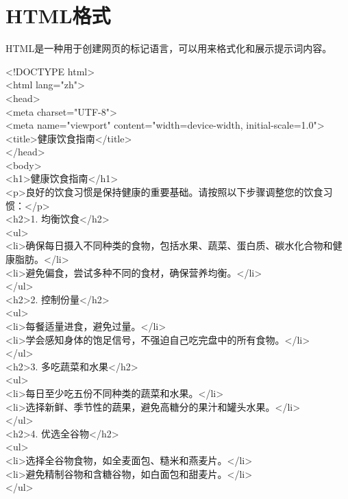 \documentclass[12pt]{book}
\begin{document}
\section{HTML格式}
HTML是一种用于创建网页的标记语言，可以用来格式化和展示提示词内容。


\begin{tcolorbox}
<!DOCTYPE html>\\
<html lang="zh">\\
<head>\\
<meta charset="UTF-8">\\
<meta name="viewport" content="width=device-width, initial-scale=1.0">\\
<title>健康饮食指南</title>\\
</head>\\
<body>\\
<h1>健康饮食指南</h1>\\
<p>良好的饮食习惯是保持健康的重要基础。请按照以下步骤调整您的饮食习惯：</p>\\

<h2>1. 均衡饮食</h2>\\
<ul>\\
<li>确保每日摄入不同种类的食物，包括水果、蔬菜、蛋白质、碳水化合物和健康脂肪。</li>\\
<li>避免偏食，尝试多种不同的食材，确保营养均衡。</li>\\
</ul>\\

<h2>2. 控制份量</h2>\\
<ul>\\
<li>每餐适量进食，避免过量。</li>\\
<li>学会感知身体的饱足信号，不强迫自己吃完盘中的所有食物。</li>\\
</ul>\\
<h2>3. 多吃蔬菜和水果</h2>\\
<ul>\\
<li>每日至少吃五份不同种类的蔬菜和水果。</li>\\
<li>选择新鲜、季节性的蔬果，避免高糖分的果汁和罐头水果。</li>\\
</ul>\\

<h2>4. 优选全谷物</h2>\\
<ul>\\
<li>选择全谷物食物，如全麦面包、糙米和燕麦片。</li>\\
<li>避免精制谷物和含糖谷物，如白面包和甜麦片。</li>\\
</ul>\\


\end{tcolorbox}
\end{document}
